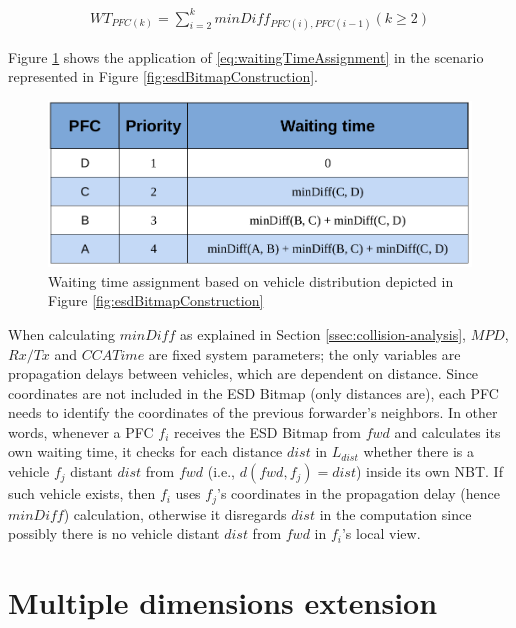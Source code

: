 			\begin{gather}
				WT_{PFC(k)} = \sum_{i=2}^{k} minDiff_{PFC(i),PFC(i-1)} (k \geq 2)
				\label{eq:waitingTimeAssignment}
			\end{gather}
			
			Figure \ref{fig:waitingTimeAssignment} shows the application of \ref{eq:waitingTimeAssignment} in the scenario represented in Figure \ref{fig:esdBitmapConstruction}.
			
			\begin{figure}[H]
				\centering
				\includegraphics[width=\textwidth]{immagini/waitingTimeAssignment}
				\caption{Waiting time assignment based on vehicle distribution depicted in Figure \ref{fig:esdBitmapConstruction}}
				\label{fig:waitingTimeAssignment}
			\end{figure}
			
			When calculating $minDiff$ as explained in Section \ref{ssec:collision-analysis}, $MPD$, $Rx/Tx$ and $CCATime$ are fixed system parameters; the only variables are propagation delays between vehicles, which are dependent on distance. Since coordinates are not included in the ESD Bitmap (only distances are), each PFC needs to identify the coordinates of the previous forwarder's neighbors. In other words, whenever a PFC $f_i$ receives the ESD Bitmap from $fwd$ and calculates its own waiting time, it checks for each distance $dist$ in $L_{dist}$ whether there is a vehicle $f_j$ distant $dist$ from $fwd$ (i.e., $d(fwd, f_j) = dist$) inside its own NBT. If such vehicle exists, then $f_i$ uses $f_j$'s coordinates in the propagation delay (hence $minDiff$) calculation, otherwise it disregards $dist$ in the computation since possibly there is no vehicle distant $dist$ from $fwd$ in $f_i$'s local view.
			
	\section{Multiple dimensions extension}
		
